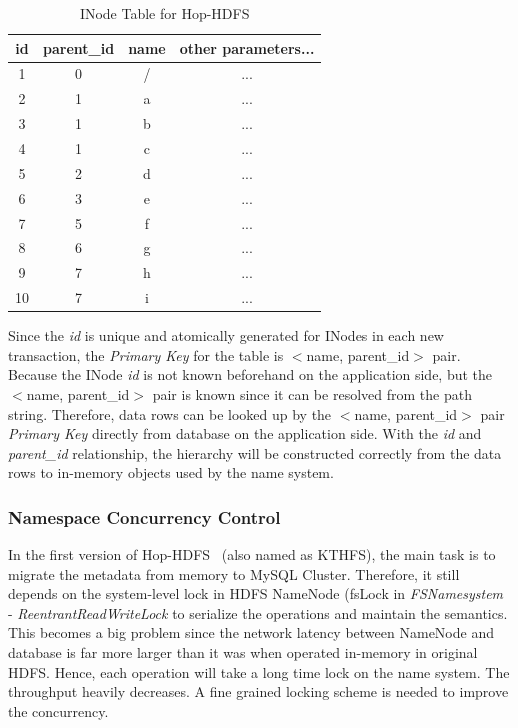 \documentclass[runningheads,a4paper]{llncs}
\begin{document}
\begin{table}[h]
	\centering
	\begin{tabular}{|c|c|c|c|}
		\hline
		\textbf{id} & \textbf{parent\_id} & \textbf{name} & \textbf{other parameters...} \\ \hline
		1 & 0 & / & ... \\ \hline
		2 & 1 & a & ... \\ \hline
		3 & 1 & b & ... \\ \hline
		4 & 1 & c & ... \\ \hline
		5 & 2 & d & ... \\ \hline
		6 & 3 & e & ... \\ \hline
		7 & 5 & f & ... \\ \hline
		8 & 6 & g & ... \\ \hline
		9 & 7 & h & ... \\ \hline
		10 & 7 & i & ... \\ \hline
	\end{tabular}
	\caption{INode Table for Hop-HDFS}
	\label{table:hoptreeTableA}
\end{table}

Since the \textit{id} is unique and atomically generated for INodes in each new transaction, the \textit{Primary Key} for the table is $<$name, parent\_id$>$ pair. Because the INode \textit{id} is not known beforehand on the application side, but the $<$name, parent\_id$>$ pair is known since it can be resolved from the path string. Therefore, data rows can be looked up by the $<$name, parent\_id$>$ pair \textit{Primary Key} directly from database on the application side. With the \textit{id} and \textit{parent\_id} relationship, the hierarchy will be constructed correctly from the data rows to in-memory objects used by the name system.

\subsubsection{Namespace Concurrency Control}
In the first version of Hop-HDFS~\cite{wasif2012distributed} (also named as KTHFS), the main task is to migrate the metadata from memory to MySQL Cluster. Therefore, it still depends on the system-level lock in HDFS NameNode (fsLock in \textit{FSNamesystem} - \textit{ReentrantReadWriteLock} to serialize the operations and maintain the semantics. This becomes a big problem since the network latency between NameNode and database is far more larger than it was when operated in-memory in original HDFS. Hence, each operation will take a long time lock on the name system. The throughput heavily decreases. A fine grained locking scheme is needed to improve the concurrency.
\end{document}
